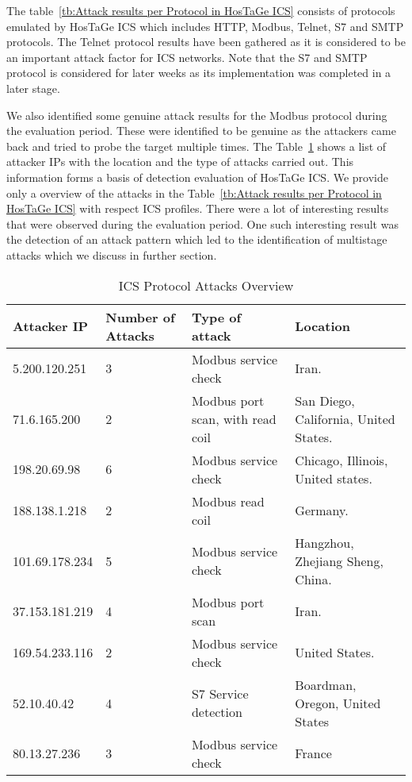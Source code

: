 \documentclass[article,msc=informatik,type=msc,colorback,accentcolor=tud9c]{tudthesis}
\begin{document}
 
 	\vspace{3mm} 	 	
 	The table~\ref{tb:Attack results per Protocol in HosTaGe ICS} consists of protocols emulated by HosTaGe ICS which includes HTTP, Modbus, Telnet, S7 and SMTP protocols. The Telnet protocol results have been gathered as it is considered to be an important attack factor for \ac{ICS} networks. Note that the S7 and SMTP protocol is considered for later weeks as its implementation was completed in a later stage. 
 	
 	
 	\vspace{3mm}
 	We also identified some genuine attack results for the Modbus protocol during the evaluation period. These were identified to be genuine as the attackers came back and tried to probe the target multiple times. The Table~\ref{tb:ICS Protocol Attacks Overview} shows a list of attacker \ac{IP}s with the location and the type of attacks carried out. This information forms a basis of detection evaluation of HosTaGe ICS. We provide only a overview of the attacks in the Table~\ref{tb:Attack results per Protocol in HosTaGe ICS} with respect \ac{ICS} profiles. There were a lot of interesting results that were observed during the evaluation period. One such interesting result was the detection of an attack pattern which led to the identification of multistage attacks which we discuss in further section. 
 	
 	\begin{table}[H]
 	\centering
	 \caption{ICS Protocol Attacks Overview}
 	\label{tb:ICS Protocol Attacks Overview}
	 \begin{tabular}{|l|l|l|l|}
	 \hline
 	\textbf{Attacker IP} & \textbf{Number of Attacks} & \textbf{Type of attack} & \textbf{Location} \\ \hline
	 5.200.120.251 & 3 & Modbus service check & Iran. \\ \hline
 	71.6.165.200 & 2 & Modbus port scan, with read coil & San Diego, California, United States. \\ \hline
	 198.20.69.98 & 6 & Modbus service check & Chicago, Illinois, United states. \\ \hline
	 188.138.1.218 & 2 & Modbus read coil & Germany. \\ \hline
	 101.69.178.234 & 5 & Modbus service check & Hangzhou, Zhejiang Sheng, China. \\ \hline
	 37.153.181.219 & 4 & Modbus port scan & Iran. \\ \hline
 	169.54.233.116 & 2 & Modbus service check & United States. \\ \hline
 52.10.40.42 & 4 & S7 Service detection & Boardman, Oregon, United States \\ \hline
 80.13.27.236 & 3 & Modbus service check & France \\ \hline
 \end{tabular}
 \end{table}
 	
\end{document}
